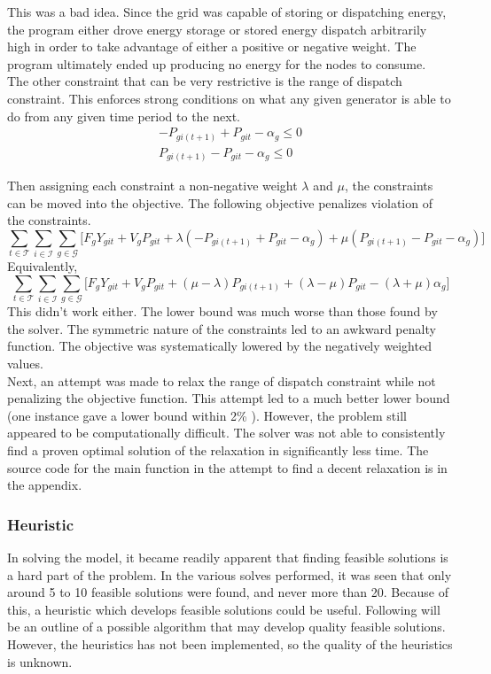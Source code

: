 This was a bad idea. Since the grid was capable of storing or dispatching energy, the program
either drove energy storage or stored energy dispatch arbitrarily high in order to take advantage of
either a positive or negative weight. The program ultimately ended up producing no energy for the
nodes to consume.  \\

The other constraint that can be very restrictive is the range of dispatch constraint. This
enforces strong conditions on what any given generator is able to do from any given time period to the
next. 
\begin{align}
	-P_{gi(t+1)} + P_{git} - \alpha_g \leq 0 \\
	P_{gi(t+1)} - P_{git} - \alpha_g \leq 0
\end{align}

Then assigning each constraint a non-negative weight $\lambda$ and $\mu$, the constraints can be moved
into the objective. The following objective penalizes violation of the constraints. 
\begin{equation}
 \sum_{t \in \mathcal{T}} \sum_{i \in \mathcal{I}} \sum_{g \in \mathcal{G}} 
	\biggl[  F_g Y_{git} + V_g P_{git} + \lambda ( -P_{gi(t+1)} + P_{git} - \alpha_g )  + \mu ( P_{gi(t+1)} - P_{git} - \alpha_g ) \biggr] 
\end{equation}
Equivalently,
\begin{equation}
 \sum_{t \in \mathcal{T}} \sum_{i \in \mathcal{I}} \sum_{g \in \mathcal{G}} 
	\biggl[  F_g Y_{git} + V_g P_{git} + (\mu - \lambda) P_{gi(t+1)} + (\lambda - \mu) P_{git} - (\lambda + \mu) \alpha_g
	 \biggr] 
\end{equation}
This didn’t work either. The lower bound was much worse than those found by the solver. The
symmetric nature of the constraints led to an awkward penalty function. The objective was
systematically lowered by the negatively weighted values. \\

Next, an attempt was made to relax the range of dispatch constraint while not penalizing the
objective function. This attempt led to a much better lower bound (one instance gave a lower bound
within 2\% ). However, the problem still appeared to be computationally difficult. The solver was not
able to consistently find a proven optimal solution of the relaxation in significantly less time.
The source code for the main function in the attempt to find a decent relaxation is in the
appendix.

\subsubsection{Heuristic}
In solving the model, it became readily apparent that finding feasible solutions is a hard part of
the problem. In the various solves performed, it was seen that only around 5 to 10 feasible solutions
were found, and never more than 20. Because of this, a heuristic which develops feasible solutions
could be useful. Following will be an outline of a possible algorithm that may develop quality feasible
solutions. However, the heuristics has not been implemented, so the quality of the heuristics is
unknown. \\

